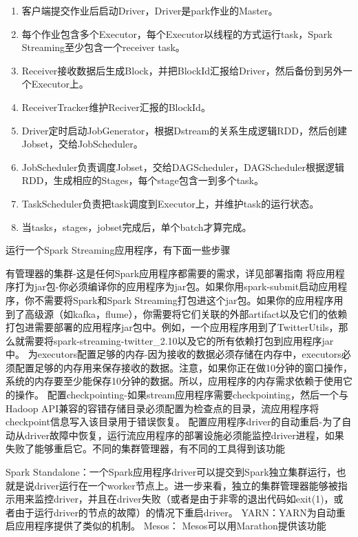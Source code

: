   \begin{enumerate}[1.]
      \item  客户端提交作业后启动Driver，Driver是park作业的Master。
      \item 每个作业包含多个Executor，每个Executor以线程的方式运行task，Spark Streaming至少包含一个receiver task。
      \item Receiver接收数据后生成Block，并把BlockId汇报给Driver，然后备份到另外一个Executor上。
      \item ReceiverTracker维护Reciver汇报的BlockId。
      \item Driver定时启动JobGenerator，根据Dstream的关系生成逻辑RDD，然后创建Jobset，交给JobScheduler。
      \item JobScheduler负责调度Jobset，交给DAGScheduler，DAGScheduler根据逻辑RDD，生成相应的Stages，每个stage包含一到多个task。
      \item TaskScheduler负责把task调度到Executor上，并维护task的运行状态。
      \item 当tasks，stages，jobset完成后，单个batch才算完成。
  \end{enumerate}

  运行一个Spark Streaming应用程序，有下面一些步骤

  有管理器的集群-这是任何Spark应用程序都需要的需求，详见部署指南
  将应用程序打为jar包-你必须编译你的应用程序为jar包。如果你用spark-submit启动应用程序，你不需要将Spark和Spark Streaming打包进这个jar包。如果你的应用程序用到了高级源（如kafka，flume），你需要将它们关联的外部artifact以及它们的依赖打包进需要部署的应用程序jar包中。例如，一个应用程序用到了TwitterUtils，那么就需要将spark-streaming-twitter\_2.10以及它的所有依赖打包到应用程序jar中。
  为executors配置足够的内存-因为接收的数据必须存储在内存中，executors必须配置足够的内存用来保存接收的数据。注意，如果你正在做10分钟的窗口操作，系统的内存要至少能保存10分钟的数据。所以，应用程序的内存需求依赖于使用它的操作。
  配置checkpointing-如果stream应用程序需要checkpointing，然后一个与Hadoop API兼容的容错存储目录必须配置为检查点的目录，流应用程序将checkpoint信息写入该目录用于错误恢复。
  配置应用程序driver的自动重启-为了自动从driver故障中恢复，运行流应用程序的部署设施必须能监控driver进程，如果失败了能够重启它。不同的集群管理器，有不同的工具得到该功能
  
  Spark Standalone：一个Spark应用程序driver可以提交到Spark独立集群运行，也就是说driver运行在一个worker节点上。进一步来看，独立的集群管理器能够被指示用来监控driver，并且在driver失败（或者是由于非零的退出代码如exit(1)，或者由于运行driver的节点的故障）的情况下重启driver。
  YARN：YARN为自动重启应用程序提供了类似的机制。
  Mesos： Mesos可以用Marathon提供该功能
  
